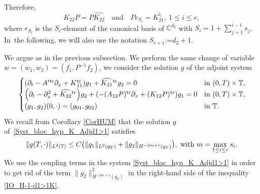 \documentclass[10pt]{amsart}
\theoremstyle{plain}
\theoremstyle{definition}
\theoremstyle{remark}
\newcommand{\set}{\mathbb}
\renewcommand{\C}{\set{C}}
\newcommand{\T}{\set{T}}
\newcommand{\Tr}[1]{{#1}{}^{\mathrm{tr}}}
\newcommand{\coloneqq}{\mathrel{\mathord{:}\mathord=}}
\let\originalleft\left
\let\originalright\right
\renewcommand{\left}{\mathopen{}\mathclose\bgroup\originalleft}
\renewcommand{\right}{\aftergroup\egroup\originalright}
\begin{document}
Therefore,
\begin{equation}
K_{22} P = P\widehat{K_{22}}\quad \text{and}\quad P e_{S_i} = K_{21}^{l_i},\ 1 \leq i \leq r,
\label{RelationK22PK21}
\end{equation}
where $e_{S_i}$ is the $S_i$-element of the canonical basis of $\C^{d_2}$ with $S_i = 1 +
\sum_{j=1}^{i-1} s_j$. In~the following, we will also use the notation $S_{r+1}\coloneqq
d_2+1$.

We argue as in the previous subsection. We perform the same change of variable $w =(w_1,w_2) = (f_1,P^{-1}f_2)$, we consider the solution $g$ of the adjoint system \begin{equation} \label{Syst_bloc_hyp_K_Adjd1>1}
\begin{cases}
\left(\partial_t -\Tr{A'}\partial_x+\Tr K_{11}\right)g_1 +\Tr{\widehat{K_{21}}} g_2= 0
&\text{in}\ (0,T)\times \T,\!\\
\left(\partial_t - \partial_x^2+\Tr{\widehat{K_{22}}}\right)g_2 +\left(-\Tr{(A_{12}P)}\partial_x+\Tr{(K_{12}P)}\right)g_1 = 0 &\text{in}\ (0,T)\times \T,\!\\
(g_1,g_2)(0,\cdot)=(g_{01},g_{02}) & \text{in}\ \T.
\end{cases}
\end{equation}
We recall from Corollary \ref{CorHUM} that the solution $g$ of~\eqref{Syst_bloc_hyp_K_Adjd1>1} satisfies
\begin{equation} \label{IO_H-1-d1>1K}
\| g(T,\cdot) \|_{L^2(\T)} \leq C \left(\| g_1\|_{L^2(q_T)} + \|g_2\|_{H^{-2m+1}(q_T)} \right),\ \text{with}\ m=\max_{1 \leq i \leq r}s_i.
\end{equation}
We use the coupling terms in the system \eqref{Syst_bloc_hyp_K_Adjd1>1} in order to get rid of the term $\|g_2\|_{H^{-2m+1}(q_T)}^2$ in the right-hand side of the inequality \eqref{IO_H-1-d1>1K}.
\end{document}
